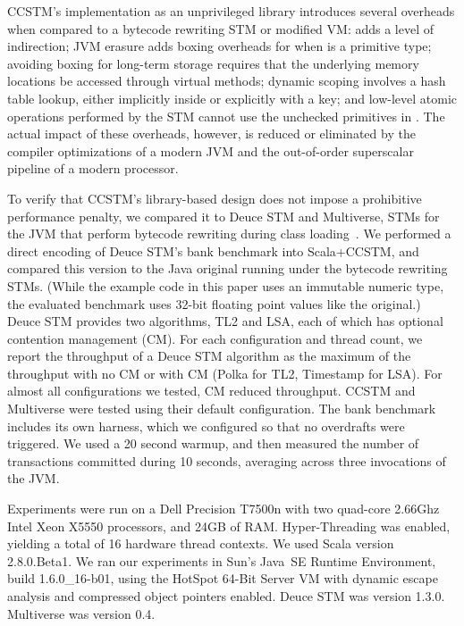 
CCSTM's implementation as an unprivileged library introduces several
overheads when compared to a bytecode rewriting STM or modified VM:
 adds a level of indirection; JVM erasure adds boxing overheads
for  when  is a primitive type; avoiding boxing
for long-term storage requires that the underlying memory locations
be accessed through virtual methods; dynamic scoping involves a hash
table lookup, either implicitly inside  or explicitly
with a  key; and low-level atomic operations performed by
the STM cannot use the unchecked primitives in .
The actual impact of these overheads, however, is reduced or eliminated
by the compiler optimizations of a modern JVM and the out-of-order
superscalar pipeline of a modern processor.

To verify that CCSTM's library-based design does not impose a prohibitive
performance penalty, we compared it to Deuce STM and Multiverse, STMs for
the JVM that perform bytecode rewriting during class
loading~\cite{deucestm,multiverse}.
We performed a direct encoding of Deuce STM's bank benchmark into
Scala+CCSTM, and compared this version to the Java original running
under the bytecode rewriting STMs.  (While the example code in this paper uses an
immutable  numeric type, the evaluated benchmark uses 32-bit
floating point values like the original.)  Deuce STM provides two algorithms,
TL2 and LSA, each of which has optional contention management (CM).
For each configuration and thread count, we report the throughput of a Deuce STM algorithm
as the maximum of the throughput with no CM or with CM (Polka for TL2, Timestamp for
LSA).
For almost all configurations we tested, CM reduced
throughput.  CCSTM and Multiverse were tested using their default
configuration.
The bank benchmark includes its own harness, which we configured so
that no overdrafts were triggered.  We used a 20 second warmup, and
then measured the number of transactions committed during 10 seconds,
averaging across three invocations of the JVM.

Experiments were run on a Dell Precision T7500n with two quad-core
2.66Ghz Intel Xeon X5550 processors, and 24GB of RAM.  Hyper-Threading was
enabled, yielding a total of 16 hardware thread contexts.  We used Scala
version 2.8.0.Beta1.  We ran our experiments in
Sun's Java~SE Runtime Environment, build 1.6.0\_16-b01, using the HotSpot
64-Bit Server VM with dynamic escape analysis and compressed object pointers
enabled.  Deuce STM was version 1.3.0.  Multiverse was version 0.4.

